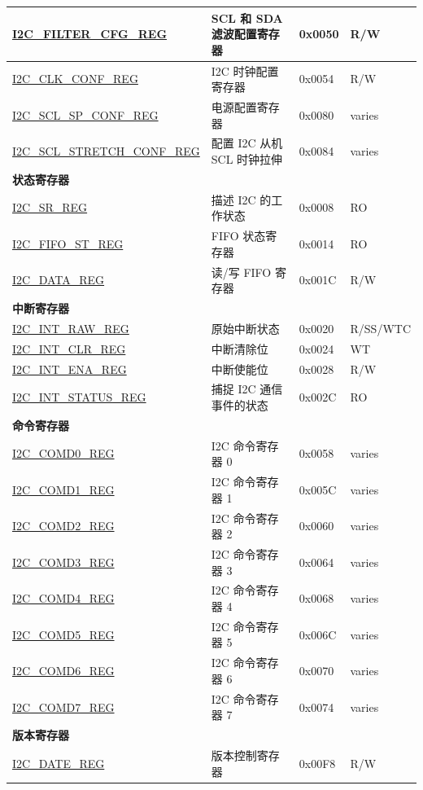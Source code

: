 \begin{longtable}{  | m{5.7cm} | m{7cm} | m{1.3cm} | m{1.5cm} | }
\hyperref[regdesc:I2CFILTERCFGREG]{I2C\_FILTER\_CFG\_REG} & SCL 和 SDA 滤波配置寄存器 & 0x0050 & R/W \\ \hline
\hyperref[regdesc:I2CCLKCONFREG]{I2C\_CLK\_CONF\_REG} & I2C 时钟配置寄存器 & 0x0054 & R/W \\ \hline
\hyperref[regdesc:I2CSCLSPCONFREG]{I2C\_SCL\_SP\_CONF\_REG} & 电源配置寄存器 & 0x0080 & varies \\ \hline
\hyperref[regdesc:I2CSCLSTRETCHCONFREG]{I2C\_SCL\_STRETCH\_CONF\_REG} & 配置 I2C 从机 SCL 时钟拉伸 & 0x0084 & varies \\ \hline
\multicolumn{4}{|l|}{\textbf{状态寄存器}} \\ \hline
\hyperref[regdesc:I2CSRREG]{I2C\_SR\_REG} & 描述 I2C 的工作状态 & 0x0008 & RO \\ \hline
\hyperref[regdesc:I2CFIFOSTREG]{I2C\_FIFO\_ST\_REG} & FIFO 状态寄存器 & 0x0014 & RO \\ \hline
\hyperref[regdesc:I2CDATAREG]{I2C\_DATA\_REG} & 读/写 FIFO 寄存器 & 0x001C & R/W \\ \hline
\multicolumn{4}{|l|}{\textbf{中断寄存器}} \\ \hline
\hyperref[regdesc:I2CINTRAWREG]{I2C\_INT\_RAW\_REG} & 原始中断状态 & 0x0020 & R/SS/WTC \\ \hline
\hyperref[regdesc:I2CINTCLRREG]{I2C\_INT\_CLR\_REG} & 中断清除位 & 0x0024 & WT \\ \hline
\hyperref[regdesc:I2CINTENAREG]{I2C\_INT\_ENA\_REG} & 中断使能位 & 0x0028 & R/W \\ \hline
\hyperref[regdesc:I2CINTSTATUSREG]{I2C\_INT\_STATUS\_REG} & 捕捉 I2C 通信事件的状态 & 0x002C & RO \\ \hline
\multicolumn{4}{|l|}{\textbf{命令寄存器}} \\ \hline
\hyperref[regdesc:I2CCOMD0REG]{I2C\_COMD0\_REG} & I2C 命令寄存器 0 & 0x0058 & varies \\ \hline
\hyperref[regdesc:I2CCOMD1REG]{I2C\_COMD1\_REG} & I2C 命令寄存器 1 & 0x005C & varies \\ \hline
\hyperref[regdesc:I2CCOMD2REG]{I2C\_COMD2\_REG} & I2C 命令寄存器 2 & 0x0060 & varies \\ \hline
\hyperref[regdesc:I2CCOMD3REG]{I2C\_COMD3\_REG} & I2C 命令寄存器 3 & 0x0064 & varies \\ \hline
\hyperref[regdesc:I2CCOMD4REG]{I2C\_COMD4\_REG} & I2C 命令寄存器 4 & 0x0068 & varies \\ \hline
\hyperref[regdesc:I2CCOMD5REG]{I2C\_COMD5\_REG} & I2C 命令寄存器 5 & 0x006C & varies \\ \hline
\hyperref[regdesc:I2CCOMD6REG]{I2C\_COMD6\_REG} & I2C 命令寄存器 6 & 0x0070 & varies \\ \hline
\hyperref[regdesc:I2CCOMD7REG]{I2C\_COMD7\_REG} & I2C 命令寄存器 7 & 0x0074 & varies \\ \hline
\multicolumn{4}{|l|}{\textbf{版本寄存器}} \\ \hline
\hyperref[regdesc:I2CDATEREG]{I2C\_DATE\_REG} & 版本控制寄存器 & 0x00F8 & R/W \\ \hline
\end{longtable}
